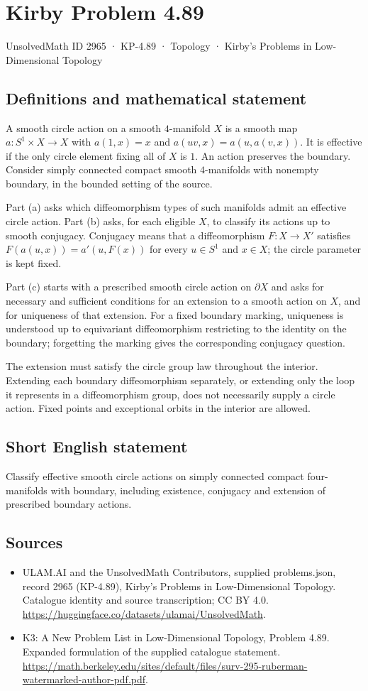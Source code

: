 \documentclass[11pt,a4paper]{article}
\begin{document}
\section*{Kirby Problem 4.89}\label{2965}
{\small UnsolvedMath ID 2965 · KP-4.89 · Topology · Kirby's Problems in Low-Dimensional Topology}
\subsection{Definitions and mathematical statement}
A smooth circle action on a smooth $4$-manifold $X$ is a smooth
map $a:S^1\times X\to X$ with $a(1,x)=x$ and
$a(uv,x)=a(u,a(v,x))$. It is effective if the only circle element
fixing all of $X$ is $1$. An action preserves the boundary.
Consider simply connected compact smooth $4$-manifolds with nonempty
boundary, in the bounded setting of the source.

Part (a) asks which diffeomorphism types of such manifolds admit
an effective circle action. Part (b) asks, for each eligible $X$,
to classify its actions up to smooth conjugacy. Conjugacy means
that a diffeomorphism $F:X\to X'$ satisfies
$F(a(u,x))=a'(u,F(x))$ for every $u\in S^1$ and $x\in X$;
the circle parameter is kept fixed.

Part (c) starts with a prescribed smooth circle action on
$\partial X$ and asks for necessary and sufficient conditions for
an extension to a smooth action on $X$, and for uniqueness of
that extension. For a fixed boundary marking, uniqueness is
understood up to equivariant diffeomorphism restricting to the
identity on the boundary; forgetting the marking gives the
corresponding conjugacy question.

The extension must satisfy the circle group law throughout the
interior. Extending each boundary diffeomorphism separately, or
extending only the loop it represents in a diffeomorphism group,
does not necessarily supply a circle action. Fixed points and
exceptional orbits in the interior are allowed.
\subsection{Short English statement}
Classify effective smooth circle actions on simply connected compact four-manifolds with boundary, including existence, conjugacy and extension of prescribed boundary actions.
\subsection{Sources}
\begin{itemize}
\item[S1] ULAM.AI and the UnsolvedMath Contributors, supplied problems.json, record 2965 (KP-4.89), Kirby's Problems in Low-Dimensional Topology. Catalogue identity and source transcription; CC BY 4.0.
\url{https://huggingface.co/datasets/ulamai/UnsolvedMath}.
\item[S2] K3: A New Problem List in Low-Dimensional Topology, Problem 4.89. Expanded formulation of the supplied catalogue statement.
\url{https://math.berkeley.edu/sites/default/files/surv-295-ruberman-watermarked-author-pdf.pdf}.
\end{itemize}
\end{document}
